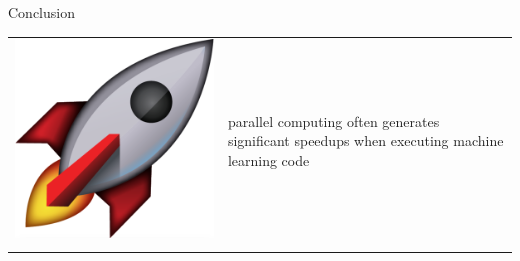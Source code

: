 \documentclass[13pt, usenames,dvipsnames]{beamer} %
\begin{document}
\begin{frame}[fragile]{Conclusion}
        \begin{tabular}{m{0.5cm} m{10cm}}
            \includegraphics[width=\linewidth] {media/rocket-emoji.png} &
        parallel computing often generates significant speedups when
            executing machine learning code \\
                                                                        & \\
        \end{tabular}
\end{frame}
\end{document}
